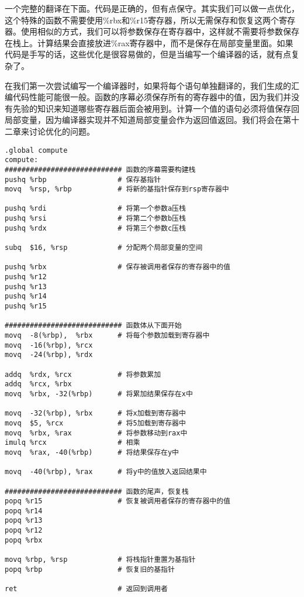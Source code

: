 \documentclass[cn,11pt,chinese]{elegantbook}
\begin{document}
一个完整的翻译在下面。代码是正确的，但有点保守。其实我们可以做一点优化，这个特殊的函数不需要使用\%rbx和\%r15寄存器，所以无需保存和恢复这两个寄存器。使用相似的方式，我们可以将参数保存在寄存器中，这样就不需要将参数保存在栈上。计算结果会直接放进\%rax寄存器中，而不是保存在局部变量里面。如果代码是手写的话，这些优化是很容易做的，但是当编写一个编译器的话，就有点复杂了。

在我们第一次尝试编写一个编译器时，如果将每个语句单独翻译的，我们生成的汇编代码性能可能很一般。函数的序幕必须保存所有的寄存器中的值，因为我们并没有先验的知识来知道哪些寄存器后面会被用到。计算一个值的语句必须将值保存回局部变量，因为编译器实现并不知道局部变量会作为返回值返回。我们将会在第十二章来讨论优化的问题。

\begin{verbatim}
.global compute
compute:
############################ 函数的序幕需要构建栈
pushq %rbp                 # 保存基指针
movq  %rsp, %rbp           # 将新的基指针保存到rsp寄存器中

pushq %rdi                 # 将第一个参数a压栈
pushq %rsi                 # 将第二个参数b压栈
pushq %rdx                 # 将第三个参数c压栈

subq  $16, %rsp            # 分配两个局部变量的空间

pushq %rbx                 # 保存被调用者保存的寄存器中的值
pushq %r12
pushq %r13
pushq %r14
pushq %r15

############################ 函数体从下面开始
movq  -8(%rbp),  %rbx      # 将每个参数加载到寄存器中
movq  -16(%rbp), %rcx
movq  -24(%rbp), %rdx

addq  %rdx, %rcx           # 将参数累加
addq  %rcx, %rbx
movq  %rbx, -32(%rbp)      # 将累加结果保存在x中

movq  -32(%rbp), %rbx      # 将x加载到寄存器中
movq  $5, %rcx             # 将5加载到寄存器中
movq  %rbx, %rax           # 将参数移动到rax中
imulq %rcx                 # 相乘
movq  %rax, -40(%rbp)      # 将结果保存在y中

movq  -40(%rbp), %rax      # 将y中的值放入返回结果中

############################ 函数的尾声，恢复栈
popq %r15                  # 恢复被调用者保存的寄存器中的值
popq %r14
popq %r13
popq %r12
popq %rbx

movq %rbp, %rsp            # 将栈指针重置为基指针
popq %rbp                  # 恢复旧的基指针

ret                        # 返回到调用者
\end{verbatim}
\end{document}

